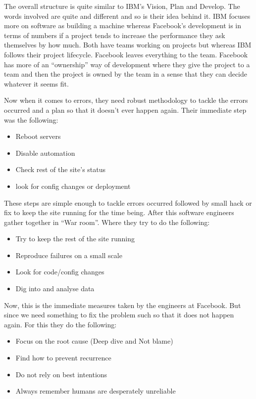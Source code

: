\documentclass[10pt]{article}
\begin{document}
The overall structure is quite similar to IBM's Vision, Plan and Develop. The words involved are quite and different and so is their idea behind it. IBM focuses more on software as building a machine whereas Facebook's development is in terms of numbers if a project tends to increase the performance they ask themselves by how much. Both have teams working on projects but whereas IBM follows their project lifecycle. Facebook leaves everything to the team. Facebook has more of an ``ownership'' way of development where they give the project to a team and then the project is owned by the team in a sense that they can decide whatever it seems fit.

Now when it comes to errors, they need robust methodology to tackle the errors occurred and a plan so that it doesn't ever happen again. Their immediate step was the following:

\begin{itemize}
      \item Reboot servers
      \item Disable automation
      \item Check rest of the site's status
      \item look for config changes or deployment
\end{itemize}

These steps are simple enough to tackle errors occurred followed by small hack or fix to keep the site running for the time being. After this software engineers gather together in ``War room''. Where they try to do the following:

\begin{itemize}
      \item Try to keep the rest of the site running
      \item Reproduce failures on a small scale
      \item Look for code/config changes
      \item Dig into and analyse data
\end{itemize}

Now, this is the immediate measures taken by the engineers at Facebook. But since we need something to fix the problem such so that it does not happen again. For this they do the following:

\begin{itemize}
      \item Focus on the root cause (Deep dive and Not blame)
      \item Find how to prevent recurrence
      \item Do not rely on best intentions
      \item Always remember humans are desperately unreliable      
\end{itemize}
\end{document}
